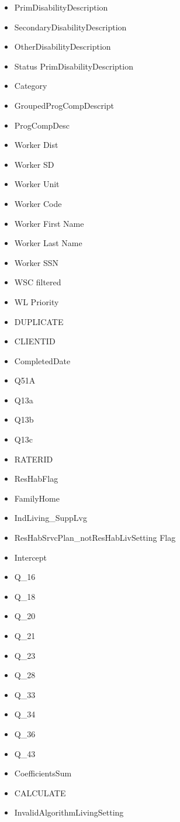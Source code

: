 \documentclass[12pt, letterpaper]{article}
\begin{document}
\begin{itemize}
	\item PrimDisabilityDescription
	\item SecondaryDisabilityDescription
	\item OtherDisabilityDescription
	\item Status PrimDisabilityDescription
	\item Category
	\item GroupedProgCompDescript
	\item ProgCompDesc
	\item Worker Dist
	\item Worker SD
	\item Worker Unit
	\item Worker Code
	\item Worker First Name
	\item Worker Last Name
	\item Worker SSN
	\item WSC filtered
	\item WL Priority
	\item DUPLICATE
	\item CLIENTID
	\item CompletedDate
	\item Q51A
	\item Q13a
	\item Q13b
	\item Q13c
	\item RATERID
	\item ResHabFlag
	\item FamilyHome
	\item IndLiving_SuppLvg
	\item ResHabSrvcPlan_notResHabLivSetting Flag
	\item Intercept
	\item Q_16
	\item Q_18
	\item Q_20
	\item Q_21
	\item Q_23
	\item Q_28
	\item Q_33
	\item Q_34
	\item Q_36
	\item Q_43
	\item CoefficientsSum
	\item CALCULATE
	\item InvalidAlgorithmLivingSetting
\end{itemize}\\
	
\end{document}
